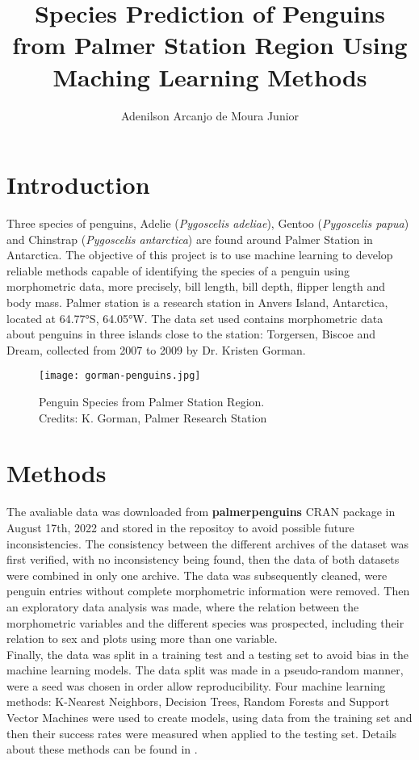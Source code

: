 \documentclass{article}
\title{Species Prediction of Penguins from Palmer Station Region Using Maching Learning Methods}
\author{Adenilson Arcanjo de Moura Junior}
\date{}
\begin{document}
\maketitle

\section{Introduction}
Three species of penguins, Adelie (\textit{Pygoscelis adeliae}), Gentoo (\textit{Pygoscelis papua}) and Chinstrap (\textit{Pygoscelis antarctica}) are found around Palmer Station in Antarctica. The objective of this project is to use machine learning to develop reliable methods capable of identifying the species of a penguin using morphometric data, more precisely, bill length, bill depth, flipper length and body mass. Palmer station is a research station in Anvers Island, Antarctica, located at 64.77°S, 64.05°W. The data set used \cite{palmer} contains morphometric data about penguins in three islands close to the station: Torgersen, Biscoe and Dream, collected from 2007 to 2009 by Dr. Kristen Gorman.

\begin{figure}[H]
    \centering
    \texttt{[image: gorman-penguins.jpg]}
    \caption{Penguin Species from Palmer Station Region. \\Credits: K. Gorman, Palmer Research Station}
    \label{fig:my_label}
\end{figure}

\section{Methods}
The avaliable data was downloaded from \textbf{palmerpenguins} CRAN package in August 17th, 2022 and stored in the repositoy to avoid possible future inconsistencies. The consistency between the different archives of the dataset was first verified, with no inconsistency being found, then the data of both datasets were combined in only one archive. The data was subsequently cleaned, were penguin entries without complete morphometric information were removed. Then an exploratory data analysis was made, where the relation between the morphometric variables and the different species was prospected, including their relation to sex and plots using more than one variable.\\

Finally, the data was split in a training test and a testing set to avoid bias in the machine learning models. The data split was made in a pseudo-random manner, were a seed was chosen in order allow reproducibility. Four machine learning methods: K-Nearest Neighbors, Decision Trees, Random Forests and Support Vector Machines were used to create models, using data from the training set and then their success rates were measured when applied to the testing set. Details about these methods can be found in \cite{James2013}.
\end{document}
